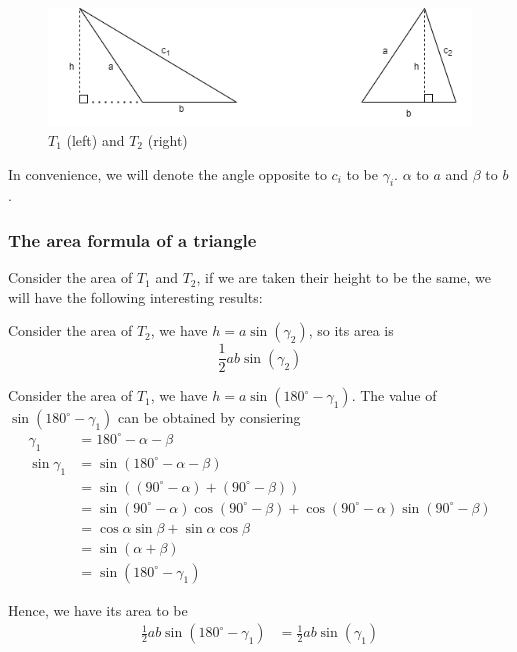 \documentclass[12pt]{article}
\begin{document}
    \begin{figure}[H]
        \centering
        \includegraphics[scale=0.8]{triangles.png}
        \caption{$T_1$ (left) and $T_2$ (right)}
    \end{figure}

    In convenience, we will denote the angle opposite to $c_i$ to be $\gamma_i$. $\alpha$ to $a$ and $\beta$ to $b$.

    \subsubsection*{The area formula of a triangle}

    Consider the area of $T_1$ and $T_2$, if we are taken their height to be the same, we will have the following interesting results:

    Consider the area of $T_2$, we have $h=a\sin(\gamma_2)$, so its area is $$\frac{1}{2}ab\sin(\gamma_2)$$

    Consider the area of $T_1$, we have $h=a\sin(180^\circ - \gamma_1)$. The value of $\sin(180^\circ - \gamma_1)$ can be obtained by consiering \begin{align*}
        \gamma_1 &= 180^\circ - \alpha - \beta\\
        \sin{\gamma_1}&=\sin(180^\circ - \alpha - \beta)\\
        &=\sin((90^\circ - \alpha) + (90^\circ - \beta))\\
        &=\sin(90^\circ - \alpha)\cos(90^\circ - \beta)+ \cos(90^\circ - \alpha)\sin(90^\circ - \beta)\\
        &=\cos{\alpha}\sin{\beta}+\sin{\alpha}\cos{\beta}\\
        &=\sin(\alpha+\beta)\\
        &=\sin(180^\circ - \gamma_1)
    \end{align*}

    Hence, we have its area to be \begin{align*}
        \frac{1}{2}ab\sin(180^\circ - \gamma_1)&=\frac{1}{2}ab\sin(\gamma_1)
    \end{align*}
\end{document}
